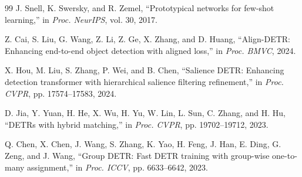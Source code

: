 \documentclass[letterpaper,journal]{IEEEtran}
\begin{document}
\begin{thebibliography}{99}
J. Snell, K. Swersky, and R. Zemel, ``Prototypical networks for few-shot learning,'' in \emph{Proc. NeurIPS}, vol. 30, 2017.

Z. Cai, S. Liu, G. Wang, Z. Li, Z. Ge, X. Zhang, and D. Huang, ``Align-DETR: Enhancing end-to-end object detection with aligned loss,'' in \emph{Proc. BMVC}, 2024.

X. Hou, M. Liu, S. Zhang, P. Wei, and B. Chen, ``Salience DETR: Enhancing detection transformer with hierarchical salience filtering refinement,'' in \emph{Proc. CVPR}, pp. 17574--17583, 2024.

D. Jia, Y. Yuan, H. He, X. Wu, H. Yu, W. Lin, L. Sun, C. Zhang, and H. Hu, ``DETRs with hybrid matching,'' in \emph{Proc. CVPR}, pp. 19702--19712, 2023.

Q. Chen, X. Chen, J. Wang, S. Zhang, K. Yao, H. Feng, J. Han, E. Ding, G. Zeng, and J. Wang, ``Group DETR: Fast DETR training with group-wise one-to-many assignment,'' in \emph{Proc. ICCV}, pp. 6633--6642, 2023.

\end{thebibliography}
\end{document}
